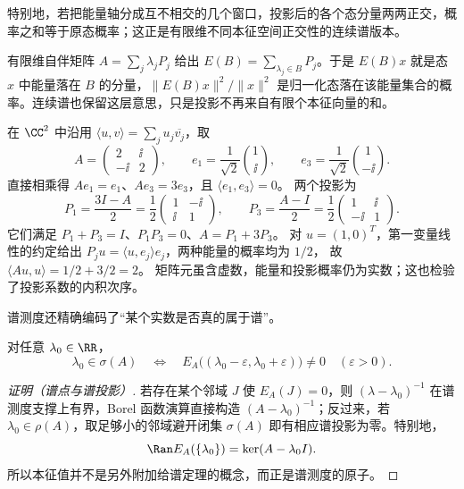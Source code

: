 特别地，若把能量轴分成互不相交的几个窗口，投影后的各个态分量两两正交，概率之和等于原态概率；这正是有限维不同本征空间正交性的连续谱版本。

有限维自伴矩阵 \(A=\sum_j\lambda_jP_j\) 给出 \(E(B)=\sum_{\lambda_j\in B}P_j\)。于是 \(E(B)x\) 就是态 \(x\) 中能量落在 \(B\) 的分量，\(\|E(B)x\|^2/\|x\|^2\) 是归一化态落在该能量集合的概率。连续谱也保留这层意思，只是投影不再来自有限个本征向量的和。

\begin{workedexample}[含复数矩阵元的谱投影]
在 $\CC^2$ 中沿用 $\langle u,v\rangle=\sum_j u_j\overline{v_j}$，取
\[
A=\begin{pmatrix}2&\ii\\-\ii&2\end{pmatrix},\qquad
e_1=\frac1{\sqrt2}\binom1\ii,\qquad
e_3=\frac1{\sqrt2}\binom1{-\ii}.
\]
直接相乘得 $Ae_1=e_1$、$Ae_3=3e_3$，且 $\langle e_1,e_3\rangle=0$。
两个投影为
\[
P_1=\frac{3I-A}{2}=\frac12\begin{pmatrix}1&-\ii\\\ii&1\end{pmatrix},
\qquad
P_3=\frac{A-I}{2}=\frac12\begin{pmatrix}1&\ii\\-\ii&1\end{pmatrix}.
\]
它们满足 $P_1+P_3=I$、$P_1P_3=0$、$A=P_1+3P_3$。
对 $u=(1,0)^T$，第一变量线性的约定给出
$P_ju=\langle u,e_j\rangle e_j$，两种能量的概率均为 $1/2$，
故 $\langle Au,u\rangle=1/2+3/2=2$。
矩阵元虽含虚数，能量和投影概率仍为实数；这也检验了投影系数的内积次序。
\end{workedexample}

谱测度还精确编码了“某个实数是否真的属于谱”。

\begin{proposition}[谱测度的支撑与原子]
对任意 $\lambda_0\in\RR$，
\begin{equation*}\lambda_0\in\sigma(A)
 \quad\Longleftrightarrow\quad
 E_A\bigl((\lambda_0-\varepsilon,\lambda_0+\varepsilon)\bigr)\neq0
 \quad(\varepsilon>0).
\end{equation*}
\end{proposition}

\begin{proof}[证明（谱点与谱投影）]
若存在某个邻域 $J$ 使 $E_A(J)=0$，则 $(\lambda-\lambda_0)^{-1}$ 在谱测度支撑上有界，Borel 函数演算直接构造 $(A-\lambda_0)^{-1}$；反过来，若 $\lambda_0\in\rho(A)$，取足够小的邻域避开闭集 $\sigma(A)$ 即有相应谱投影为零。特别地，
\begin{equation*}\Ran E_A(\{\lambda_0\})=\ker(A-\lambda_0I).
\end{equation*}
所以本征值并不是另外附加给谱定理的概念，而正是谱测度的原子。
\end{proof}


